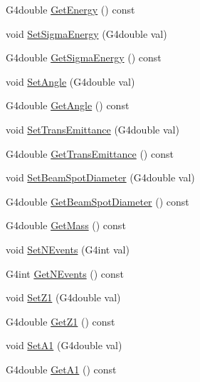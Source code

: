 \begin{DoxyCompactItemize}
\item 
G4double \hyperlink{classEMMAPrimaryGeneratorAction_a18a66727ceaba1dba7850dc2845760c3}{Get\+Energy} () const 
\item 
void \hyperlink{classEMMAPrimaryGeneratorAction_a63a286019f963a4d854eadd1b2ee2535}{Set\+Sigma\+Energy} (G4double val)
\item 
G4double \hyperlink{classEMMAPrimaryGeneratorAction_a8cf15975c9bf0f7b661c729a13a9c5dc}{Get\+Sigma\+Energy} () const 
\item 
void \hyperlink{classEMMAPrimaryGeneratorAction_a776c65fd63c96267f395cd3ea6d1d6be}{Set\+Angle} (G4double val)
\item 
G4double \hyperlink{classEMMAPrimaryGeneratorAction_a36df61a330381f666c0990fd5c3d2d2b}{Get\+Angle} () const 
\item 
void \hyperlink{classEMMAPrimaryGeneratorAction_a1404d5ac500b5b4832e53125d539aa9a}{Set\+Trans\+Emittance} (G4double val)
\item 
G4double \hyperlink{classEMMAPrimaryGeneratorAction_a277e2b5042287a2aa135f0e768022af4}{Get\+Trans\+Emittance} () const 
\item 
void \hyperlink{classEMMAPrimaryGeneratorAction_a27bce1862403abdb30f25a3ca4714059}{Set\+Beam\+Spot\+Diameter} (G4double val)
\item 
G4double \hyperlink{classEMMAPrimaryGeneratorAction_a8339cfe8be7eaf791711b5e26465dca7}{Get\+Beam\+Spot\+Diameter} () const 
\item 
G4double \hyperlink{classEMMAPrimaryGeneratorAction_a394c8bc73059e782c166bde3d8b85eaf}{Get\+Mass} () const 
\item 
void \hyperlink{classEMMAPrimaryGeneratorAction_a9c73d7c8bef752566ccb1f9c372b2aec}{Set\+N\+Events} (G4int val)
\item 
G4int \hyperlink{classEMMAPrimaryGeneratorAction_a630169d3432ae05cb8209cc1392ebde5}{Get\+N\+Events} () const 
\item 
void \hyperlink{classEMMAPrimaryGeneratorAction_a6e8abf29c88e75d9906f92ac71d0a37b}{Set\+Z1} (G4double val)
\item 
G4double \hyperlink{classEMMAPrimaryGeneratorAction_ae2c4dd7820d113340324f3fa1c1e4f9e}{Get\+Z1} () const 
\item 
void \hyperlink{classEMMAPrimaryGeneratorAction_a722ce9f9aaf509fb7815ef5719409c2f}{Set\+A1} (G4double val)
\item 
G4double \hyperlink{classEMMAPrimaryGeneratorAction_a8dfa88f3d96bdbd1c37643bfb3deef5e}{Get\+A1} () const 
\item 

\end{DoxyCompactItemize}
